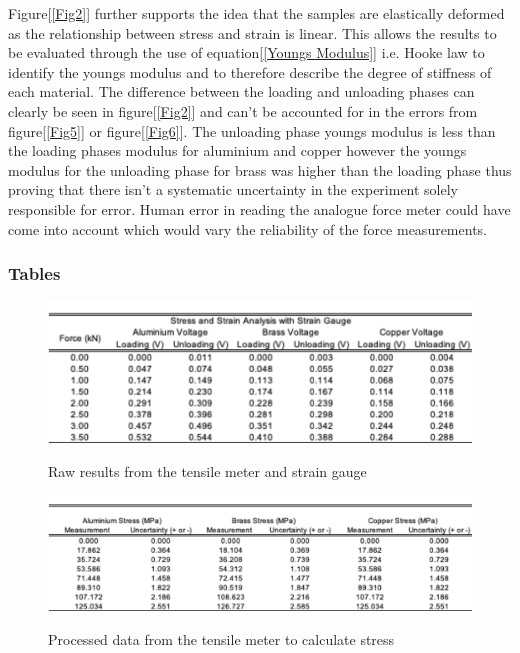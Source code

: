 \documentclass[a4paper,10pt]{article}
\begin{document}
Figure[\ref{Fig2}] further supports the idea that the samples are elastically deformed as the relationship between stress and strain is linear. This allows the results to be evaluated through the use of equation[\ref{Youngs Modulus}] i.e. Hooke law to identify the youngs modulus and to therefore describe the degree of stiffness of each material. The difference between the loading and unloading phases can clearly be seen in figure[\ref{Fig2}] and can't be accounted for in the errors from figure[\ref{Fig5}] or figure[\ref{Fig6}]. The unloading phase youngs modulus is less than the loading phases modulus for aluminium and copper however the youngs modulus for the unloading phase for brass was higher than the loading phase thus proving that there isn't a systematic uncertainty in the experiment solely responsible for error. Human error in reading the analogue force meter could have come into account which would vary the reliability of the force measurements. 
\subsubsection{Tables}
\begin{figure}[!]
\centering
\caption{Raw results from the tensile meter and strain gauge}
\includegraphics[width=\textwidth]{Picture_raw_strain_gauge.png}
\label{Fig3}
\end{figure}

\begin{figure}[!]
\centering
\caption{Processed data from the tensile meter to calculate stress}
\includegraphics[width=\textwidth]{processed_strain_gauge.png}
\label{Fig4}
\end{figure}
\end{document}
